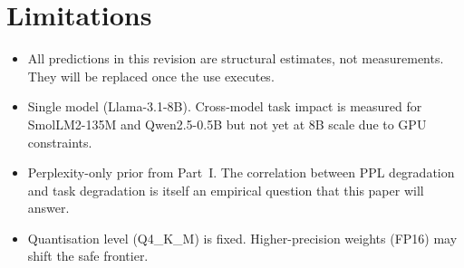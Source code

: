 \documentclass[11pt]{article}
\begin{document}
\section{Limitations}
\label{sec:limits}

\begin{itemize}
\item All predictions in this revision are structural estimates, not
      measurements.  They will be replaced once the use executes.
\item Single model (Llama-3.1-8B).  Cross-model task impact is
      measured for SmolLM2-135M and Qwen2.5-0.5B but not yet at 8B
      scale due to GPU constraints.
\item Perplexity-only prior from Part~I.  The correlation between PPL
      degradation and task degradation is itself an empirical question
      that this paper will answer.
\item Quantisation level (Q4\_K\_M) is fixed.  Higher-precision weights
      (FP16) may shift the safe frontier.
\end{itemize}

\printbibliography
\end{document}
